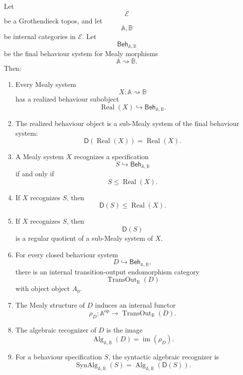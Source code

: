 \begin{theorem}
\label{thm:eilenberg-reiterman-main-consolidation}
Let
\[
\mathcal E
\]
be a Grothendieck topos, and let
\[
\mathbb A,\mathbb B
\]
be internal categories in \(\mathcal E\). Let
\[
\mathsf{Beh}_{\mathbb A,\mathbb B}
\]
be the final behaviour system for Mealy morphisms
\[
\mathbb A\rightsquigarrow\mathbb B.
\]
Then:

\begin{enumerate}
\item Every Mealy system
\[
X:\mathbb A\rightsquigarrow\mathbb B
\]
has a realized behaviour subobject
\[
\operatorname{Real}(X)
\hookrightarrow
\mathsf{Beh}_{\mathbb A,\mathbb B}.
\]

\item The realized behaviour object is a sub-Mealy system of the final
behaviour system:
\[
\mathsf D(\operatorname{Real}(X))
=
\operatorname{Real}(X).
\]

\item A Mealy system \(X\) recognizes a specification
\[
S\hookrightarrow\mathsf{Beh}_{\mathbb A,\mathbb B}
\]
if and only if
\[
S\leq\operatorname{Real}(X).
\]

\item If \(X\) recognizes \(S\), then
\[
\mathsf D(S)\leq\operatorname{Real}(X).
\]

\item If \(X\) recognizes \(S\), then
\[
\mathsf D(S)
\]
is a regular quotient of a sub-Mealy system of \(X\).

\item For every closed behaviour system
\[
D\hookrightarrow\mathsf{Beh}_{\mathbb A,\mathbb B},
\]
there is an internal transition-output endomorphism category
\[
\operatorname{TransOut}_{\mathbb B}(D)
\]
with object object \(A_0\).

\item The Mealy structure of \(D\) induces an internal functor
\[
\rho_D:
\mathbb A^{\mathrm{op}}
\to
\operatorname{TransOut}_{\mathbb B}(D).
\]

\item The algebraic recognizer of \(D\) is the image
\[
\operatorname{Alg}_{\mathbb A,\mathbb B}(D)
=
\operatorname{im}(\rho_D).
\]

\item For a behaviour specification \(S\), the syntactic algebraic recognizer
is
\[
\operatorname{SynAlg}_{\mathbb A,\mathbb B}(S)
=
\operatorname{Alg}_{\mathbb A,\mathbb B}(\mathsf D(S)).
\]


\end{enumerate}
\end{theorem}
